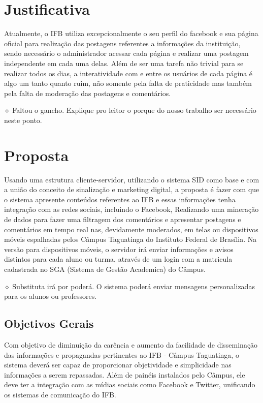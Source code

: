 \documentclass[
	12pt,				%
	openright,			%
	oneside,			%
	a4paper,			%
	english,			%
	french,				%
	spanish,			%
	brazil,				%
	]{abntex2}
\newcommand{\danielobs}[1]{{\color{red} $\diamond$ #1}}
\begin{document}
\section*{Justificativa}
	Atualmente, o IFB utiliza excepcionalmente o seu perfil do facebook e sua página oficial para realização das postagens referentes a informações da instituição, sendo necessário o administrador acessar cada página e realizar uma postagem independente em cada uma delas. Além de ser uma tarefa não trivial para se realizar todos os dias, a interatividade com e entre os usuários de cada página é algo um tanto quanto ruim, não somente pela falta de praticidade mas também pela falta de moderação das postagens e comentários.
	
	\danielobs{Faltou o gancho. Explique pro leitor o porque do nosso trabalho ser necessário neste ponto.}
	
	
\section*{Proposta}
	Usando uma estrutura cliente-servidor, utilizando o sistema SID como base e com a união do conceito de sinalização e marketing digital, a proposta é fazer com que o sistema apresente conteúdos referentes ao IFB e essas informações tenha integração com as redes sociais, incluindo o Facebook, Realizando uma mineração de dados para fazer uma filtragem dos comentários e apresentar postagens e comentários em tempo real nas, devidamente moderados, em telas ou dispositivos móveis espalhadas pelos Câmpus Taguatinga do Instituto Federal de Brasília. Na versão para dispositivos móveis, o servidor irá enviar informações e avisos distintos para cada aluno ou turma, através de um login com a matricula cadastrada no SGA (Sistema de Gestão Academica) do Câmpus.
	
	\danielobs{Substituta irá por poderá. O sistema poderá enviar mensagens personalizadas para os alunos ou professores.}
\subsection*{Objetivos Gerais}
	Com objetivo de diminuição da carência e aumento da facilidade de disseminação das informações e propagandas pertinentes ao IFB - Câmpus Taguatinga, o sistema deverá ser capaz de proporcionar objetividade e simplicidade nas informações a serem repassadas. Além de painéis instalados pelo Câmpus, ele deve ter a integração com as mídias sociais como Facebook e Twitter, unificando os sistemas de comunicação do IFB.
	
\end{document}
